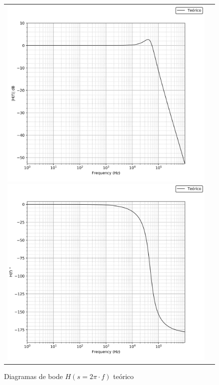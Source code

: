 \begin{figure}[H]
    \centering
    \begin{tabular}{c c}
        \includegraphics[scale=0.4]{Recursos/bode_teorico_pasabajos_modulo.png}
        \includegraphics[scale=0.4]{Recursos/bode_teorico_pasabajos_fase.png}
    \end{tabular}
    \caption{Diagramas de bode $H(s=2\pi \cdot f)$ te\'orico}
    \label{fig:bode_teorico}
\end{figure}

